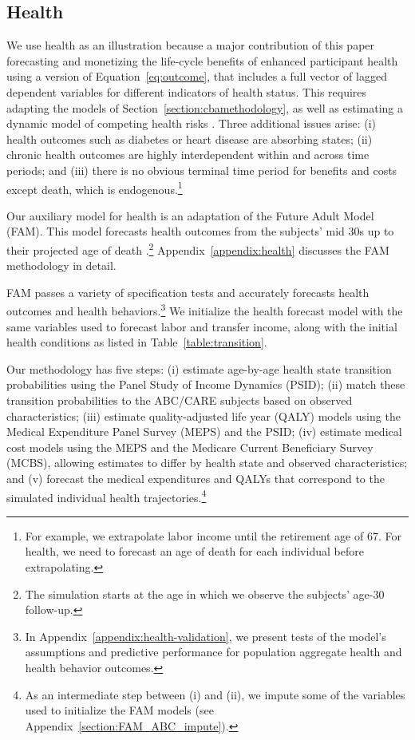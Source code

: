\subsection{Health}

We use health as an illustration because a major contribution of this paper forecasting and monetizing the life-cycle benefits of enhanced participant health using a version of Equation~\eqref{eq:outcome}, that includes a full vector of lagged dependent variables for different indicators of health status. This requires adapting the models of Section~\ref{section:cbamethodology}, as well as estimating a dynamic model of competing health risks \citep{Kalbfleisch_Prentice_1980_failure}. Three additional issues arise: (i) health outcomes such as diabetes or heart disease are absorbing states; (ii) chronic health outcomes are highly interdependent within and across time periods; and (iii) there is no obvious terminal time period for benefits and costs except death, which is endogenous.\footnote{For example, we extrapolate labor income until the retirement age of 67. For health, we need to forecast an age of death for each individual before extrapolating.}

Our auxiliary model for health is an adaptation of the Future Adult Model (FAM). This model forecasts health outcomes from the subjects' mid 30s up to their projected age of death \citep{Goldman_etal_2015_Future-Elderly-Model-Report}.\footnote{The simulation starts at the age in which we observe the subjects' age-30 follow-up.}  Appendix~\ref{appendix:health} discusses the FAM methodology in detail.

FAM passes a variety of specification tests and accurately forecasts health outcomes and health behaviors.\footnote{In Appendix~\ref{appendix:health-validation}, we present tests of the model's assumptions and predictive performance for population aggregate health and health behavior outcomes.} We initialize the health forecast model with the same variables used to forecast labor and transfer income, along with the initial health conditions as listed in Table~\ref{table:transition}.

Our methodology has five steps: (i) estimate age-by-age health state transition probabilities using the Panel Study of Income Dynamics (PSID); (ii) match these transition probabilities to the ABC/CARE subjects based on observed characteristics; (iii) estimate quality-adjusted life year (QALY) models using the Medical Expenditure Panel Survey (MEPS) and the PSID; (iv) estimate medical cost models using the MEPS and the Medicare Current Beneficiary Survey (MCBS), allowing estimates to differ by health state and observed characteristics; and (v) forecast the medical expenditures and QALYs that correspond to the simulated individual health trajectories.\footnote{As an intermediate step between (i) and (ii), we impute some of the variables used to initialize the FAM models (see  Appendix~\ref{section:FAM_ABC_impute}).}

